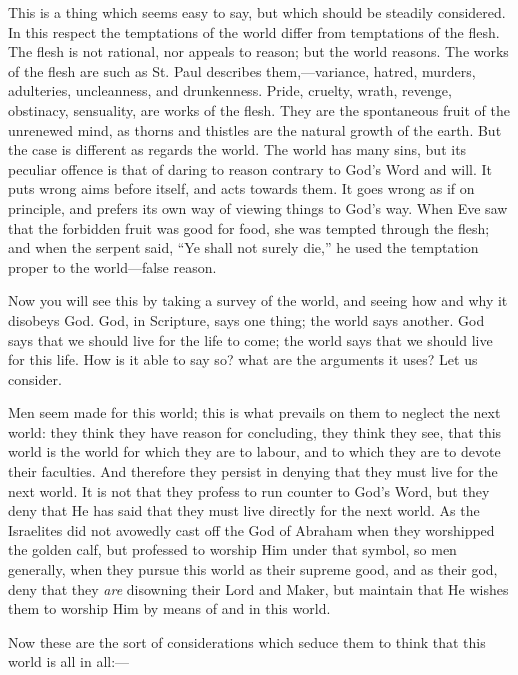 This is a thing which seems easy to say, but which should be
steadily considered. In this respect the temptations of the world
differ from temptations of the flesh. The flesh is not rational, nor
appeals to reason; but the world reasons. The works of the flesh are
such as St. Paul describes them,—variance, hatred, murders,
adulteries, uncleanness, and drunkenness. Pride, cruelty, wrath,
revenge, obstinacy, sensuality, are works of the flesh. They are the
spontaneous fruit of the unrenewed mind, as thorns and thistles are
the natural growth of the earth. But the case is different as regards
the world. The world has many sins, but its peculiar offence is that
of daring to reason contrary to God's Word and will. It puts wrong
aims before itself, and acts towards them. It goes wrong as if on
principle, and prefers its own way of viewing things to God's way.
When Eve saw that the forbidden fruit was good for food, she was
tempted through the flesh; and when the serpent said, ``Ye shall
not surely die,'' he used the temptation proper to the world—false
reason.

Now you will see this by taking a survey of the world, and seeing
how and why it disobeys God. God, in Scripture, says one thing; the
world says another. God says that we should live for the life to come;
the world says that we should live for this life. How is it able to
say so? what are the arguments it uses? Let us consider.

Men seem made for this world; this is what prevails on them to
neglect the next world: they think they have reason for concluding,
they think they see, that this world is the world for which they are
to labour, and to which they are to devote their faculties. And
therefore they persist in denying that they must live for the next
world. It is not that they profess to run counter to God's Word, but
they deny that He has said that they must live directly for the next
world. As the Israelites did not avowedly cast off the God of Abraham
when they worshipped the golden calf, but professed to worship Him
under that symbol, so men generally, when they pursue this world as
their supreme good, and as their god, deny that they \emph{are}
disowning their Lord and Maker, but maintain that He wishes them to
worship Him by means of and in this world.

Now these are the sort of considerations which seduce them to think
that this world is all in all:—


